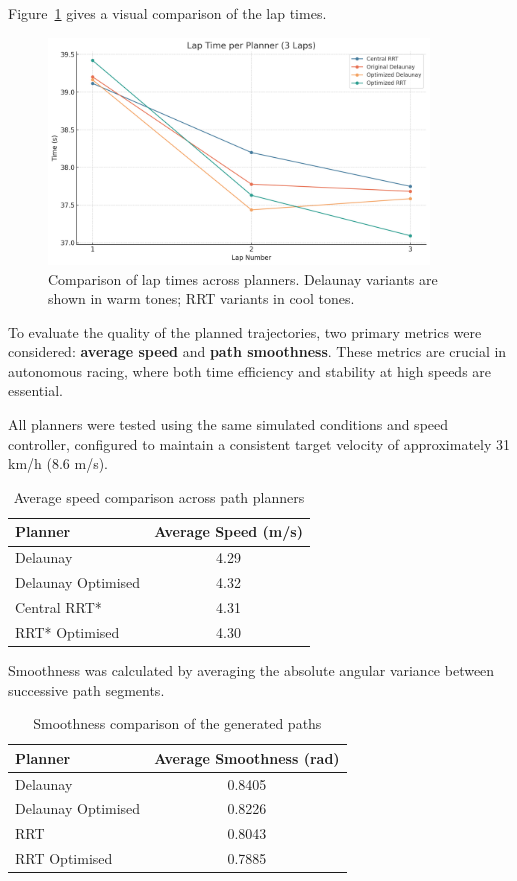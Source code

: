 \documentclass[a4paper,11pt]{report}
\begin{document}
Figure~\ref{fig:lap-times-plot} gives a visual comparison of the lap times.
\begin{figure}[H]
\centering
\includegraphics[width=0.9\textwidth]{Images/lap_time_table_plot_colored.png}
\caption{Comparison of lap times across planners. Delaunay variants are shown in warm tones; RRT variants in cool tones.}
\label{fig:lap-times-plot}
\end{figure}

To evaluate the quality of the planned trajectories, 
two primary metrics were considered: \textbf{average speed} and \textbf{path smoothness}. 
These metrics are crucial in autonomous racing, where both time efficiency and stability at 
high speeds are essential.

All planners were tested using the same simulated conditions and speed controller, 
configured to maintain a consistent target velocity of approximately 31 km/h (8.6 m/s). 
\begin{table}[H]
\centering
\begin{tabular}{|l|c|}
\hline
\textbf{Planner} & \textbf{Average Speed (m/s)} \\
\hline
Delaunay & 4.29 \\
Delaunay Optimised & 4.32 \\
Central RRT* & 4.31 \\
RRT* Optimised & 4.30 \\
\hline
\end{tabular}
\caption{Average speed comparison across path planners}
\label{averagespeed}
\end{table}

Smoothness was calculated by averaging the absolute angular variance between successive path segments.

\begin{table}[H]
    \centering
    \begin{tabular}{|l|c|}
    \hline
    \textbf{Planner} & \textbf{Average Smoothness (rad)} \\
    \hline
    Delaunay & 0.8405 \\
    Delaunay Optimised & 0.8226 \\
    RRT & 0.8043 \\
    RRT Optimised & 0.7885 \\
    \hline
    \end{tabular}
    \caption{Smoothness comparison of the generated paths}
    \label{smoothness}
    \end{table}
\end{document}
